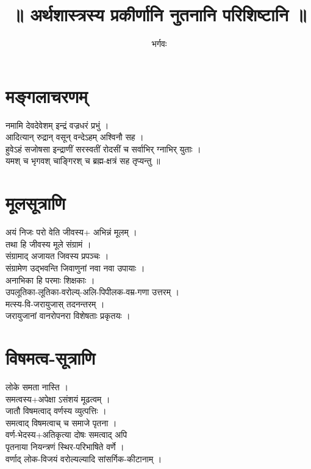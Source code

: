 \documentclass[12pt]{article}
\title{\textbf{ {\skt ॥ अर्थशास्त्रस्य प्रकीर्णानि नुतनानि परिशिष्टानि ॥
}}}
\author{{\skt भर्गवः
}}
\date{}
\begin{document}
\maketitle

\section{{\skt मङ्गलाचरणम्
}}
{\skt नमामि देवदेवेशम् इन्द्रं वज्रधरं प्रभुं । \\
आदित्यान् रुद्रान् वसून् वन्देऽहम् अश्विनौ सह । \\
हुवेऽहं सजोषसा इन्द्राणीं सरस्वतीं रोदसीं च सर्वाभिर् ग्नाभिर् युताः ।\\
यमश् च भृगवश् चाङ्गिरश् च ब्रह्म-क्षत्रं सह तृप्यन्तु ॥\\
}
\section{{ \skt मूलसूत्राणि
}}
{ \skt अयं निजः परो वेति जीवस्य+ अभिन्नं मूलम् ।\\
तथा हि जीवस्य मूले संग्रामं ।\\
संग्रामाद् अजायत जिवस्य प्रपञ्चः ।\\
संग्रामेण उद्भवन्ति जिवाणुनां नवा नवा उपायाः ।\\
अनाभिका हि परमाः शिक्षकाः । \\
उपलूतिका-लूतिका-वरोल्य्-अलि-पिपीलक-वम्र-गणा उत्तरम् ।\\
मत्स्य-वि-जरायुजास् तदनन्तरम् ।\\
जरायुजानां वानरोपनरा विशेषताः प्रकृतयः ।\\
}
\section{{\skt विषमत्व-सूत्राणि
}}
{\skt लोके समता नास्ति ।\\
समत्वस्य+अपेक्षा ऽसंशयं मूढत्वम् ।\\
जातौ विषमत्वाद् वर्णस्य व्युत्पत्तिः ।\\
समत्वाद् विषमत्वाच् च समाजे पृतना ।\\
वर्ण-भेदस्य+अतिकृत्या दोषः समत्वाद् अपि\\
पृतनाया नियन्त्रणं स्थिर-परिभाषिते वर्णे ।\\
वर्णाद् लोक-विजयं वरोल्यल्यादि सांसर्गिक-कीटानाम् ।\\
}
\end{document}
